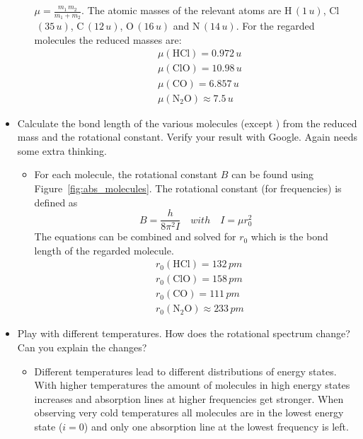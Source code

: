 \documentclass[paper=a4, fontsize=11pt]{scrartcl}
\begin{document}
\begin{itemize}
\begin{itemize}
            $\mu = \frac{m_1\,m_2}{m_1 + m_2}$. The atomic masses of the
            relevant atoms are H\,$(1\,u)$, Cl$\,(35\,u)$, C$\,(12\,u)$,
            O$\,(16\,u)$ and N$\,(14\,u)$.  For the regarded molecules
            the reduced masses are:
              \begin{align*}
                &\mu(\mathrm{HCl}) = 0.972\,u \\
                &\mu(\mathrm{ClO}) = 10.98\,u \\
                &\mu(\mathrm{CO}) = 6.857\,u \\
                &\mu(\mathrm{N_2O}) \approx 7.5\,u
              \end{align*}
        \end{itemize}
    \item Calculate the bond length of the various molecules (except
        ) from the reduced mass and the rotational constant. Verify
        your result with Google. Again  needs some extra thinking.
        \begin{itemize}
          \item For each molecule, the rotational constant $B$ can be found
            using Figure~\ref{fig:abs_molecules}.  The rotational constant
            (for frequencies) is defined as
            \begin{equation*}
              B = \frac{h}{8 \pi^2 I} \quad with \quad I = \mu r_0^2
            \end{equation*}
            The equations can be combined and solved for $r_0$ which is the
            bond length of the regarded molecule.
            \begin{align*}
               &r_0(\mathrm{HCl}) = 132\,pm \\
               &r_0(\mathrm{ClO}) = 158\,pm \\
               &r_0(\mathrm{CO}) = 111\,pm \\
               &r_0(\mathrm{N_2O}) \approx 233\,pm
            \end{align*}
        \end{itemize}
    \item Play with different temperatures. How does the rotational spectrum
        change? Can you explain the changes?
        \begin{itemize}
          \item Different temperatures lead to different distributions of
            energy states. With higher temperatures the amount of molecules
            in high energy states increases and absorption lines at higher
            frequencies get stronger. When observing very cold temperatures
            all molecules are in the lowest energy state ($i = 0$) and only
            one absorption line at the lowest frequency is left.
        \end{itemize}
\end{itemize}
\end{document}
